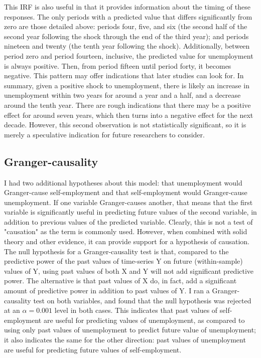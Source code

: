 \documentclass[]{ecca}
\begin{document}
This IRF is also useful in that it provides information about the timing of these responses. The only periods with a predicted value that differs significantly from zero are those detailed above: periods four, five, and six (the second half of the second year following the shock through the end of the third year); and periods nineteen and twenty (the tenth year following the shock). Additionally, between period zero and period fourteen, inclusive, the predicted value for unemployment is always positive. Then, from period fifteen until period forty, it becomes negative. This pattern may offer indications that later studies can look for. In summary, given a positive shock to unemployment, there is likely an increase in unemployment within two years for around a year and a half, and a decrease around the tenth year. There are rough indications that there may be a positive effect for around seven years, which then turns into a negative effect for the next decade. However, this second observation is not statistically significant, so it is merely a speculative indication for future researchers to consider. 

\subsection{Granger-causality}

I had two additional hypotheses about this model: that unemployment would Granger-cause self-employment and that self-employment would Granger-cause unemployment. If one variable Granger-causes another, that means that the first variable is significantly useful in predicting future values of the second variable, in addition to previous values of the predicted variable. Clearly, this is not a test of "causation" as the term is commonly used. However, when combined with solid theory and other evidence, it can provide support for a hypothesis of causation. The null hypothesis for a Granger-causality test is that, compared to the predictive power of the past values of time-series Y on future (within-sample) values of Y, using past values of both X and Y will not add significant predictive power. The alternative is that past values of X do, in fact, add a significant amount of predictive power in addition to past values of Y. I ran a Granger-causality test on both variables, and found that the null hypothesis was rejected at an $\alpha = 0.001$ level in both cases. This indicates that past values of self-employment are useful for predicting values of unemployment, as compared to using only past values of unemployment to predict future value of unemployment; it also indicates the same for the other direction: past values of unemployment are useful for predicting future values of self-employment.
\end{document}
